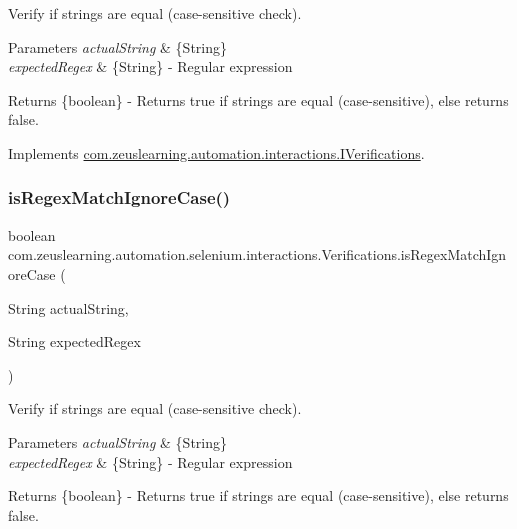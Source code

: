 Verify if strings are equal (case-\/sensitive check).


\begin{DoxyParams}{Parameters}
{\em actual\+String} & \{String\} \\
\hline
{\em expected\+Regex} & \{String\} -\/ Regular expression \\
\hline
\end{DoxyParams}
\begin{DoxyReturn}{Returns}
\{boolean\} -\/ Returns {\ttfamily true} if strings are equal (case-\/sensitive), else returns {\ttfamily false}. 
\end{DoxyReturn}


Implements \hyperlink{interfacecom_1_1zeuslearning_1_1automation_1_1interactions_1_1IVerifications_ac9e92358d7f62a1cf1c2760ada26cde9}{com.\+zeuslearning.\+automation.\+interactions.\+I\+Verifications}.

\hypertarget{classcom_1_1zeuslearning_1_1automation_1_1selenium_1_1interactions_1_1Verifications_aec4f646bd4791291b242ad202fd928ea}{}\label{classcom_1_1zeuslearning_1_1automation_1_1selenium_1_1interactions_1_1Verifications_aec4f646bd4791291b242ad202fd928ea} 
\subsubsection{\texorpdfstring{is\+Regex\+Match\+Ignore\+Case()}{isRegexMatchIgnoreCase()}}
{\footnotesize\ttfamily boolean com.\+zeuslearning.\+automation.\+selenium.\+interactions.\+Verifications.\+is\+Regex\+Match\+Ignore\+Case (\begin{DoxyParamCaption}\item[{String}]{actual\+String,  }\item[{String}]{expected\+Regex }\end{DoxyParamCaption})\hspace{0.3cm}{\ttfamily [inline]}}

Verify if strings are equal (case-\/sensitive check).


\begin{DoxyParams}{Parameters}
{\em actual\+String} & \{String\} \\
\hline
{\em expected\+Regex} & \{String\} -\/ Regular expression \\
\hline
\end{DoxyParams}
\begin{DoxyReturn}{Returns}
\{boolean\} -\/ Returns {\ttfamily true} if strings are equal (case-\/sensitive), else returns {\ttfamily false}. 
\end{DoxyReturn}


